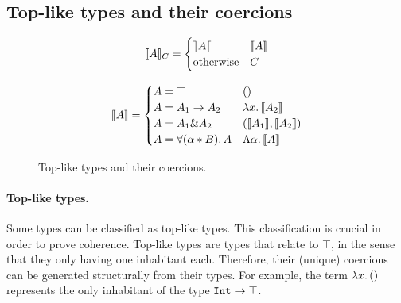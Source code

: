\subsection{Top-like types and their coercions}
\begin{figure}[!t]
\begin{minipage}[t]{.5\textwidth}
  \begin{center} 
  \[
  \llbracket A \rrbracket_{C} = 
  \begin{cases} 
        \rceil A \lceil & \llbracket A \rrbracket \\ 
        \text{otherwise} & {C} 
  \end{cases}
  \]
  \end{center}
\end{minipage}
\begin{minipage}[t]{.5\textwidth}

  \[
  \llbracket A \rrbracket = 
  \begin{cases} 
        A = \top & () \\
        A = A_1 \to A_2 & \lambda x.\, \llbracket A_2 \rrbracket \\
        A = A_1 \& A_2 & (\llbracket A_1 \rrbracket, \llbracket A_2 \rrbracket) \\
        A = \forall (\alpha * B).\, A & \Lambda \alpha.\, \llbracket A \rrbracket
  \end{cases}
  \]
\end{minipage}
  \caption{Top-like types and their coercions.}
  \label{fig:andcoercion}
\end{figure}
\paragraph{Top-like types.}
Some \name types can be classified as top-like types.
This classification is crucial in order to prove coherence.
Top-like types are types that relate to $\top$, in the sense that they
only having one inhabitant each.
Therefore, their (unique) coercions can be generated structurally from their types. 
For example, the term $\lambda x.\, ()$ represents the only inhabitant of the type 
$\texttt{Int} \to \top$.

